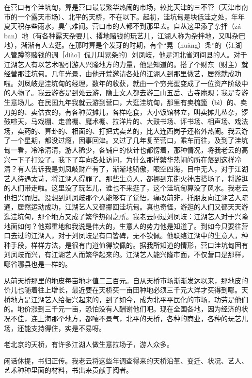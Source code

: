 \documentclass[12pt,UTF8]{ctexbook}
\begin{document}
在营口有个洼坑甸，算是营口最最繁华热闹的市场，较比天津的三不管（天津市南市的一个露天市场）、北平的天桥，不在以下。起初，洼坑甸是块低洼之处，年年夏天积存些雨水，臭气难闻。营口市的人都不到那里去。自从这里添了杂拌（zá ban）地（有各种露天杂耍儿、撂地赌钱的玩艺儿，江湖人称为杂拌地，又叫杂巴地），渐渐有人去逛。在那时算是个发芽的时期，有个“晃（huàng）条”的（江湖人管蹲签赌钱的调［diào］侃儿叫晃条的）刘凤岐，他是河北省河间县的人。对于江湖艺人有以艺术吸引游人兴隆地方的力量，他是知道的。搭了个财东（财主）就经营那洼坑甸。几年光景，由他开荒邀请各处的江湖人到那里做艺，居然就成功啦。刘凤岐是洼坑甸的经理，数年的收获，就由一个穷光蛋变成了一位资产阶级中的人物了。我云游客是到处云游，隐士文人都去游三山五岳、古寺庵观；我是专游生意场儿。在民国九年我就云游到营口，大逛洼坑甸，那里有卖梳篦（bì）的、卖刀剪的、卖估衣的，有各种货摊儿，各样吃食，大小饭馆林立，叫卖摊儿丛杂，锣鼓喧天，马戏棚、走兽棚、魔术棚、拉洋片的、大鼓书场、评书场、相声场、戏法场，卖药的、算卦的、相面的、打把式卖艺的，比大连西岗子还格外热闹。我云游了一个星期，都没过瘾，因事回津。又过了几年复至营口，乘车而往，及到了洼坑甸一看，冷冷清清，游人稀少，各铺户的伙计也都愣着，那种情况，将我老云的高兴一下子打没了。我下了车向各处访问，为什么那样繁华热闹的所在落到这样冷清？有人告诉我是刘凤岐财产有了，渐渐地骄傲，眼空四海，目中无人，对于江湖艺人待遇太苛，将江湖人得罪了。那些生意人，都挪到东街火神庙搭场子，将游逛的人们带走啦。这里没了玩艺儿，谁也不来逛了，这个洼坑甸算没了风水。我老云也扫兴而归。没想到刘凤岐那个人能够有了觉悟，痛改前非，托朋友向江湖艺人疏通，居然运动成功，江湖艺人又都挪回洼坑甸。真也奇怪，游逛的人们又都天天游逛洼坑甸，那个地方又成了繁华热闹之所。我老云问过刘凤岐：江湖艺人对于兴隆地面如何？他郑重地和我说是伟大的，生意人的势力他是知道了。到如今只要往营口去过的江湖人，对于刘凤岐是有口皆碑，无不钦佩。他联络江湖中的生意人，种种手段，样样方法，是很有门道值得钦佩的。据我所知道的情形，营口洼坑甸因有刘凤岐而兴，有江湖艺人而繁华起来的。江湖艺人能兴隆市面，不仅营口是那样，哪省哪县也是一样的。

从前天桥那里的地皮每亩地才值二三百元。自从天桥市场渐渐发达以来，那地皮的价儿也随着往上增长，最近要在天桥买一亩田种地必须三千元大洋才买得到哪。天桥地方是江湖艺人给振兴起来的，到了如今，成为北平平民化的市场，功劳是他们的。地价涨到三千元一亩，恐怕没有人酬谢他们吧。现在全国各地，因为经济的状况不佳，连上海那个地方，都嚷不景气，北平的天桥，各种的商业，各种的玩艺儿场，还能支持得住，实是不易呀。

老北京的天桥，有许多江湖人做生意拉场子，游人众多。



闲话休提，书归正传。我老云将这些年调查得来的天桥沿革、变迁、状况、艺人、艺术种种里面的材料，书出来贡献于阅者。
\end{document}
